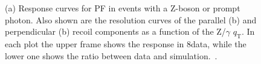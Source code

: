 \begin{figure}[!htb]
\begin{center}
\end{center} 
\caption{(a) Response curves for PF \ptvecmiss in events with a Z-boson or prompt photon.
Also shown are the resolution curves of the parallel (b) and perpendicular (b) recoil components as a function of the Z/$\gamma$ $q_\mathrm{T}$. 
In each plot the upper frame shows the response in 8\TeV data, while the lower one shows the ratio between data and simulation.~\cite{Khachatryan:2014gga}.}
\label{fig:met_resol}
\end{figure}

